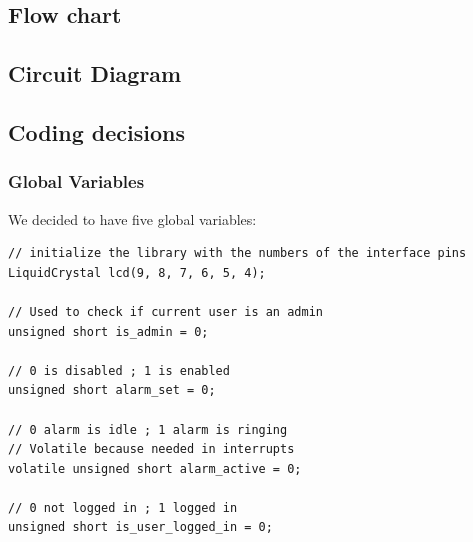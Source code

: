 \documentclass[a4paper,11pt]{article}
\theoremstyle{mytheor}
\begin{document}
\subsection{Flow chart}
\newpage
{}

\subsection{Circuit Diagram}

\subsection{Coding decisions}

\subsubsection{Global Variables}
We decided to have five global variables:

\begin{lstlisting}
// initialize the library with the numbers of the interface pins
LiquidCrystal lcd(9, 8, 7, 6, 5, 4);

// Used to check if current user is an admin
unsigned short is_admin = 0;

// 0 is disabled ; 1 is enabled
unsigned short alarm_set = 0;

// 0 alarm is idle ; 1 alarm is ringing
// Volatile because needed in interrupts
volatile unsigned short alarm_active = 0;

// 0 not logged in ; 1 logged in 
unsigned short is_user_logged_in = 0;
\end{lstlisting}
\end{document}
